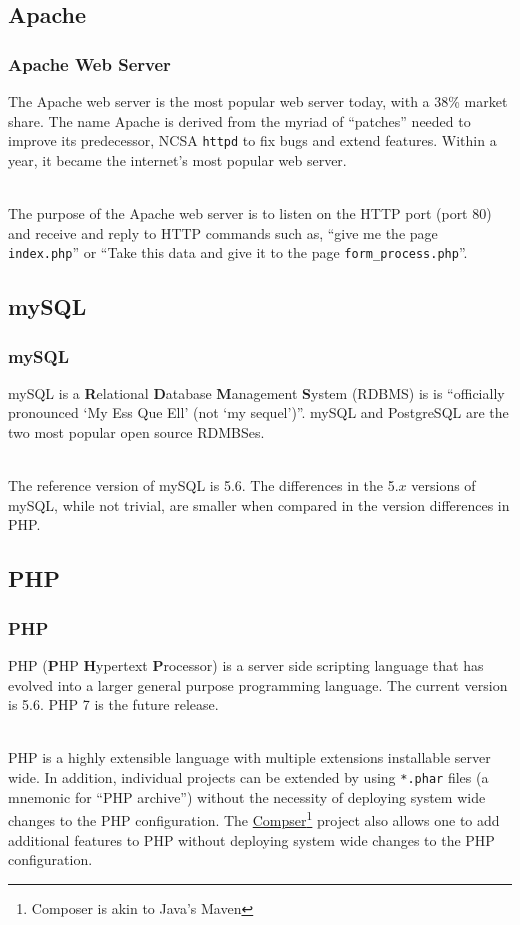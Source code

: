 \documentclass[aspectratio=169]{beamer}
\begin{document}
\subsection{Apache}
\begin{frame}
\frametitle{Apache Web Server}
The Apache web server is the most popular web server today, with a 38\% market share. \cite{netcraft} The name Apache is derived from the myriad of ``patches'' needed to improve its predecessor, NCSA \texttt{httpd} to fix bugs and extend features. Within a year, it became the internet's most popular web server. \cite{apache}

\pause
\mbox{}\\
The purpose of the Apache web server is to listen on the HTTP port (port 80) and receive and reply to HTTP commands such as, ``give me the page \texttt{index.php}'' or ``Take this data and give it to the page \texttt{form\_process.php}''.
\end{frame}

\subsection{mySQL}
\begin{frame}
\frametitle{mySQL}
mySQL is a \textbf{R}elational \textbf{D}atabase \textbf{M}anagement \textbf{S}ystem (RDBMS) is is ``officially pronounced `My Ess Que Ell' (not `my sequel')''. \cite{mysql} mySQL and PostgreSQL are the two most popular open source RDMBSes.

\mbox{}\\
The reference version of mySQL is 5.6. The differences in the 5.$x$ versions of mySQL, while not trivial, are smaller when compared in the version differences in PHP.
\end{frame}

\subsection{PHP}
\begin{frame}
\frametitle{PHP}
PHP (\textbf{P}HP \textbf{H}ypertext \textbf{P}rocessor) is a server side scripting language that has evolved into a larger general purpose programming language. The current version is 5.6. PHP 7 is the future release.

\mbox{}\\
PHP is a highly extensible language with multiple extensions installable server wide. In addition, individual projects can be extended by using \texttt{*.phar} files (a mnemonic for ``PHP archive'') without the necessity of deploying system wide changes to the PHP configuration. The \href{https://getcomposer.org/}{Compser}\footnote{Composer is akin to Java's Maven} project also allows one to add additional features to PHP without deploying system wide changes to the PHP configuration.
\end{frame}
\end{document}
